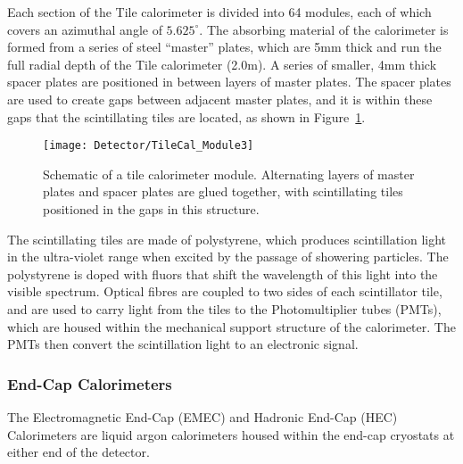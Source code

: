 Each section of the Tile calorimeter is divided into 64 modules, each of which covers an azimuthal angle of $5.625^\circ$.
The absorbing material of the calorimeter is formed from a series of steel ``master'' plates, which are 5mm thick and run the full radial depth of the Tile calorimeter (2.0m). A series of smaller, 4mm thick spacer plates are positioned in between layers of master plates. The spacer plates are used to create gaps between adjacent master plates, and it is within these gaps that the scintillating tiles are located, as shown in Figure~\ref{fig_tile_module}.
\begin{figure}[tb]
\begin{center}
\texttt{[image: Detector/TileCal\_Module3]}
\end{center}
\caption[Schematic of a tile calorimeter module]{Schematic of a tile calorimeter module. Alternating layers of master plates and spacer plates are glued together, with scintillating tiles positioned in the gaps in this structure.}
\label{fig_tile_module}
\end{figure}
The scintillating tiles are made of polystyrene, which produces scintillation light in the ultra-violet range when excited by the passage of showering particles. The polystyrene is doped with fluors that shift the wavelength of this light into the visible spectrum. Optical fibres are coupled to two sides of each scintillator tile, and are used to carry light from the tiles to the Photomultiplier tubes (PMTs), which are housed within the mechanical support structure of the calorimeter. The PMTs then convert the scintillation light to an electronic signal.


%
%
%
%

\subsubsection{End-Cap Calorimeters}

The Electromagnetic End-Cap  (EMEC) and Hadronic End-Cap (HEC) Calorimeters are liquid argon calorimeters housed within the end-cap cryostats at either end of the detector.

